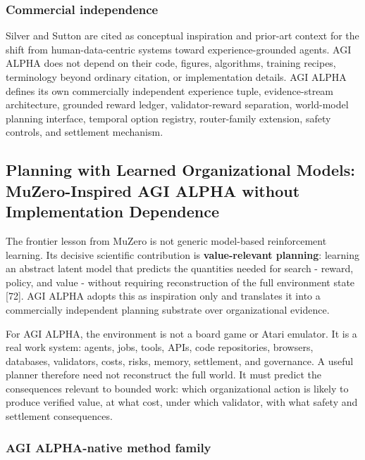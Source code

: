 \documentclass[11pt]{article}
\begin{document}
\subsubsection{Commercial independence}\label{commercial-independence}

Silver and Sutton are cited as conceptual inspiration and prior-art
context for the shift from human-data-centric systems toward
experience-grounded agents. AGI ALPHA does not depend on their code,
figures, algorithms, training recipes, terminology beyond ordinary
citation, or implementation details. AGI ALPHA defines its own
commercially independent experience tuple, evidence-stream architecture,
grounded reward ledger, validator-reward separation, world-model
planning interface, temporal option registry, router-family extension,
safety controls, and settlement mechanism.


\subsection{Planning with Learned Organizational Models: MuZero-Inspired
AGI ALPHA without Implementation
Dependence}\label{planning-with-learned-organizational-models-muzero-inspired-agi-alpha-without-implementation-dependence}

The frontier lesson from MuZero is not generic model-based reinforcement
learning. Its decisive scientific contribution is \textbf{value-relevant
planning}: learning an abstract latent model that predicts the
quantities needed for search - reward, policy, and value - without
requiring reconstruction of the full environment state {[}72{]}. AGI
ALPHA adopts this as inspiration only and translates it into a
commercially independent planning substrate over organizational
evidence.

For AGI ALPHA, the environment is not a board game or Atari emulator. It
is a real work system: agents, jobs, tools, APIs, code repositories,
browsers, databases, validators, costs, risks, memory, settlement, and
governance. A useful planner therefore need not reconstruct the full
world. It must predict the consequences relevant to bounded work: which
organizational action is likely to produce verified value, at what cost,
under which validator, with what safety and settlement consequences.

\subsubsection{AGI ALPHA-native method
family}\label{agi-alpha-native-method-family}
\end{document}
